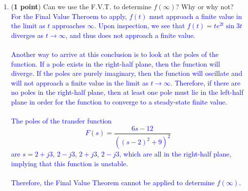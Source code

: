 \documentclass[]{article}
\begin{document}
\begin{enumerate}
\begin{enumerate}
        \item (\textbf{1 point}) Can we use the F.V.T. to determine $f(\infty)$? Why or why not?\\
        \textcolor{blue}{
        For the Final Value Theroem to apply, $f(t)$ must approach a finite value in the limit as $t$ approaches $\infty$. Upon inspection, we see that $f(t)=te^{2t}\sin{3t}$ diverges as $t \rightarrow \infty$, and thus does not approach a finite value.\\\\
        Another way to arrive at this conclusion is to look at the poles of the function. If a pole exists in the right-half plane, then the function will diverge. If the poles are purely imaginary, then the function will oscillate and will not approach a finite value in the limit as $t \rightarrow \infty$. Therefore, if there are no poles in the right-half plane, then at least one pole must lie in the left-half plane in order for the function to converge to a steady-state finite value.\\\\
        The poles of the transfer function $$F(s)=\frac{6s-12}{((s-2)^2+9)^2}$$ are $s=2+j3$, $2-j3$, $2+j3$, $2-j3$, which are all in the right-half plane, implying that this function is unstable.\\\\
        Therefore, the Final Value Theorem cannot be applied to determine $f(\infty)$.
        }
    \end{enumerate}
    \vspace{0.4 cm}



\end{enumerate}
\end{document}
